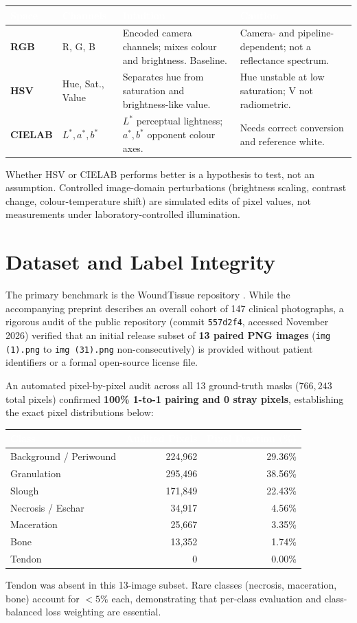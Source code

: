 \documentclass[12pt,a4paper]{article}
\newcommand{\thead}[1]{\cellcolor{navy}\textcolor{white}{\textbf{#1}}}
\begin{document}
\begin{center}\small
\begin{tabularx}{\linewidth}{>{\bfseries}l l Y Y}
\toprule
\thead{Space} & \thead{Channels} & \thead{Intuition} & \thead{Caution}\\
\midrule
RGB & R, G, B & Encoded camera channels; mixes colour and brightness. Baseline. & Camera- and pipeline-dependent; not a reflectance spectrum.\\
HSV & Hue, Sat., Value & Separates hue from saturation and brightness-like value. & Hue unstable at low saturation; V not radiometric.\\
CIELAB & $L^*,a^*,b^*$ & $L^*$ perceptual lightness; $a^*,b^*$ opponent colour axes. & Needs correct conversion and reference white.\\
\bottomrule
\end{tabularx}
\end{center}
Whether HSV or CIELAB performs better is a hypothesis to test, not an assumption. Controlled image-domain perturbations (brightness scaling, contrast change, colour-temperature shift) are simulated edits of pixel values, not measurements under laboratory-controlled illumination.

\section{Dataset and Label Integrity}
The primary benchmark is the WoundTissue repository \cite{woundtissue}. While the accompanying preprint describes an overall cohort of 147 clinical photographs, a rigorous audit of the public repository (commit \texttt{557d2f4}, accessed November 2026) verified that an initial release subset of \textbf{13 paired PNG images} (\texttt{img (1).png} to \texttt{img (31).png} non-consecutively) is provided without patient identifiers or a formal open-source license file. 

An automated pixel-by-pixel audit across all 13 ground-truth masks ($766{,}243$ total pixels) confirmed \textbf{100\% 1-to-1 pairing and 0 stray pixels}, establishing the exact pixel distributions below:

\begin{center}\small
\begin{tabular}{lrr}
\toprule
\thead{Class} & \thead{Audited Pixels} & \thead{Pixel Fraction (\%)}\\
\midrule
Background / Periwound & 224,962 & 29.36\%\\
Granulation & 295,496 & 38.56\%\\
Slough & 171,849 & 22.43\%\\
Necrosis / Eschar & 34,917 & 4.56\%\\
Maceration & 25,667 & 3.35\%\\
Bone & 13,352 & 1.74\%\\
Tendon & 0 & 0.00\%\\
\bottomrule
\end{tabular}
\end{center}
Tendon was absent in this 13-image subset. Rare classes (necrosis, maceration, bone) account for $<5\%$ each, demonstrating that per-class evaluation and class-balanced loss weighting are essential.
\end{document}
